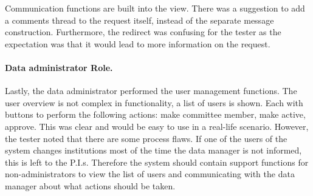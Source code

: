 Communication functions are built into the view.  
There was a suggestion to add a comments thread to the request itself, instead of the separate message construction.
Furthermore, the redirect was confusing for the tester as the expectation was that it would lead to more information on the request.

\paragraph{Data administrator Role.}
Lastly, the data administrator performed the user management functions.
The user overview is not complex in functionality, a list of users is shown.
Each with buttons to perform the following actions: make committee member, make active, approve.
This was clear and would be easy to use in a real-life scenario.
However, the tester noted that there are some process flaws.
If one of the users of the system changes institutions most of the time the data manager is not informed, this is left to the P.I.s.
Therefore the system should contain support functions for non-administrators to view the list of users and communicating with the data manager about what actions should be taken.